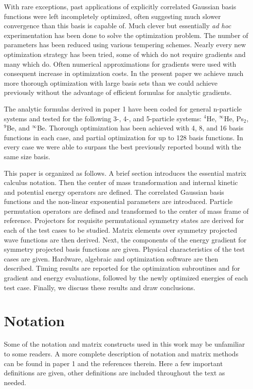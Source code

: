 \documentclass[12pt,thmsa,suthesis,verbatim]{report}
\begin{document}
With rare exceptions, past applications of explicitly correlated Gaussian
basis functions were left incompletely optimized, often suggesting much
slower convergence than this basis is capable of. Much clever but
essentially \textit{ad hoc} experimentation has been done to solve the
optimization problem. The number of parameters has been reduced using
various tempering schemes. Nearly every new optimization strategy has been
tried, some of which do not require gradients and many which do. Often
numerical approximations for gradients were used with consequent increase in
optimization costs. In the present paper we achieve much more thorough
optimization with large basis sets than we could achieve previously without
the advantage of efficient formulas for analytic gradients.

The analytic formulas derived in paper 1 have been coded for general
n-particle systems and tested for the following 3-, 4-, and 5-particle
systems: $^4$He, $^\infty $He, Ps$_2$, $^9$Be, and $^\infty $Be. Thorough
optimization has been achieved with 4, 8, and 16 basis functions in each
case, and partial optimization for up to 128 basis functions. In every case
we were able to surpass the best previously reported bound with the same
size basis.

This paper is organized as follows. A brief section introduces the essential
matrix calculus notation. Then the center of mass transformation and
internal kinetic and potential energy operators are defined. The correlated
Gaussian basis functions and the non-linear exponential parameters are
introduced. Particle permutation operators are defined and transformed to
the center of mass frame of reference. Projectors for requisite
permutational symmetry states are derived for each of the test cases to be
studied. Matrix elements over symmetry projected wave functions are then
derived. Next, the components of the energy gradient for symmetry projected
basis functions are given. Physical characteristics of the test cases are
given. Hardware, algebraic and optimization software are then described.
Timing results are reported for the optimization subroutines and for
gradient and energy evaluations, followed by the newly optimized energies of
each test case. Finally, we discuss these results and draw conclusions.

\section{Notation}

Some of the notation and matrix constructs used in this work may be
unfamiliar to some readers. A more complete description of notation and
matrix methods can be found in paper 1 and the references therein. Here a
few important definitions are given, other definitions are included
throughout the text as needed.
\end{document}

